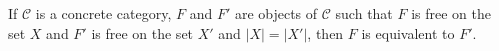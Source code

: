 \begin{theorem}
If $\mathcal{C}$ is a concrete category, $F$ and $F'$ are objects of $\mathcal{C}$ such that $F$ is free on the set $X$ and $F'$ is free on the set $X'$ and $|X| = |X'|$, then $F$ is equivalent to $F'$.
\end{theorem}
